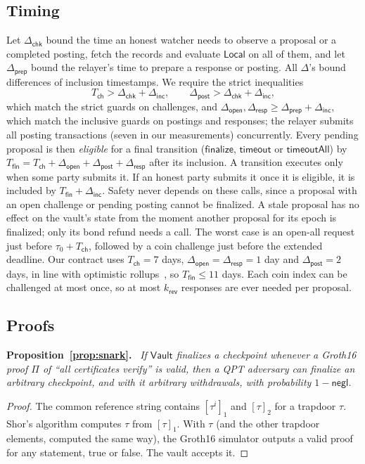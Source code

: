 \documentclass[10pt,journal,compsoc]{IEEEtran}
\theoremstyle{tplain}
\theoremstyle{tdef}
\theoremstyle{remark}
\newcommand{\negl}{\mathsf{negl}}
\newcommand{\kr}{k_{\mathsf{rev}}}
\newcommand{\Vault}{\mathsf{Vault}}
\newenvironment{restate}[1]{\par\smallskip\noindent\textbf{#1.}\ \itshape\ignorespaces}{\par\smallskip}
\begin{document}
\subsection{Timing}\label{S-opf-timing}
Let $\Delta_{\mathsf{chk}}$ bound the time an honest watcher needs to observe a proposal or a completed posting, fetch the records and evaluate $\mathsf{Local}$ on all of them, and let $\Delta_{\mathsf{prep}}$ bound the relayer's time to prepare a response or posting. All $\Delta$'s bound differences of inclusion timestamps. We require the strict inequalities
\[
T_{\mathsf{ch}}> \Delta_{\mathsf{chk}}+\Delta_{\mathsf{inc}},\qquad \Delta_{\mathsf{post}}> \Delta_{\mathsf{chk}}+\Delta_{\mathsf{inc}},
\]
which match the strict guards on challenges, and $\Delta_{\mathsf{open}},\Delta_{\mathsf{resp}}\ge\Delta_{\mathsf{prep}}+\Delta_{\mathsf{inc}}$, which match the inclusive guards on postings and responses; the relayer submits all posting transactions (seven in our measurements) concurrently. Every pending proposal is then \emph{eligible} for a final transition ($\mathsf{finalize}$, $\mathsf{timeout}$ or $\mathsf{timeoutAll}$) by $T_{\mathsf{fin}}=T_{\mathsf{ch}}+\Delta_{\mathsf{open}}+\Delta_{\mathsf{post}}+\Delta_{\mathsf{resp}}$ after its inclusion. A transition executes only when some party submits it. If an honest party submits it once it is eligible, it is included by $T_{\mathsf{fin}}+\Delta_{\mathsf{inc}}$. Safety never depends on these calls, since a proposal with an open challenge or pending posting cannot be finalized. A stale proposal has no effect on the vault's state from the moment another proposal for its epoch is finalized; only its bond refund needs a call. The worst case is an open-all request just before $\tau_0+T_{\mathsf{ch}}$, followed by a coin challenge just before the extended deadline. Our contract uses $T_{\mathsf{ch}}=7$ days, $\Delta_{\mathsf{open}}=\Delta_{\mathsf{resp}}=1$ day and $\Delta_{\mathsf{post}}=2$ days, in line with optimistic rollups~\cite{kalodner2018arbitrum}, so $T_{\mathsf{fin}}\le 11$ days. Each coin index can be challenged at most once, so at most $\kr$ responses are ever needed per proposal.

\subsection{Proofs}

\begin{restate}{Proposition~\ref{prop:snark}}
If $\Vault$ finalizes a checkpoint whenever a Groth16 proof $\Pi$ of ``all certificates verify'' is valid, then a QPT adversary can finalize an arbitrary checkpoint, and with it arbitrary withdrawals, with probability $1-\negl$.
\end{restate}
\begin{proof}
The common reference string contains $[\tau^i]_1$ and $[\tau]_2$ for a trapdoor $\tau$. Shor's algorithm computes $\tau$ from $[\tau]_1$. With $\tau$ (and the other trapdoor elements, computed the same way), the Groth16 simulator outputs a valid proof for any statement, true or false. The vault accepts it.
\end{proof}
\end{document}
